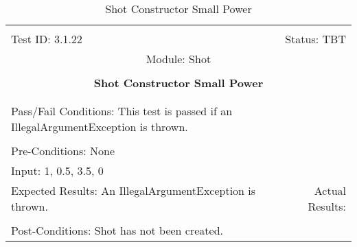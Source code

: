 \documentclass[titlepage]{article}
\begin{document}
\begin{center}%
\begin{table}
\begin{tabular}{|l r|}\hline&\\[-2mm]
	Test ID: 3.1.22	&Status: TBT\\[-3mm]
	\multicolumn{2}{|c|}{Module: Shot}\\&\\
	\multicolumn{2}{|c|}{\textbf{\large{Shot Constructor Small Power}}}\\&\\\hline&\\[-3mm]
	\multicolumn{2}{|p{\textwidth}|}{Pass/Fail Conditions: This test is passed if an IllegalArgumentException is thrown.}\\[1mm]\hline&\\[-3mm]
	\multicolumn{2}{|p{\textwidth}|}{Pre-Conditions: None}\\[4mm]
	\multicolumn{2}{|p{\textwidth}|}{Input: 1, 0.5, 3.5, 0}\\[2mm]\hline
	\multicolumn{1}{|p{0.49\textwidth}}{Expected Results: An IllegalArgumentException is thrown.}	&\multicolumn{1}{|p{0.45\textwidth}|}{Actual Results: }\\\hline&\\[-3mm]
	\multicolumn{2}{|p{\textwidth}|}{Post-Conditions: Shot has not been created.}\\\hline
\end{tabular}
\caption{Shot Constructor Small Power}
\end{table}
\end{center}
\end{document}
